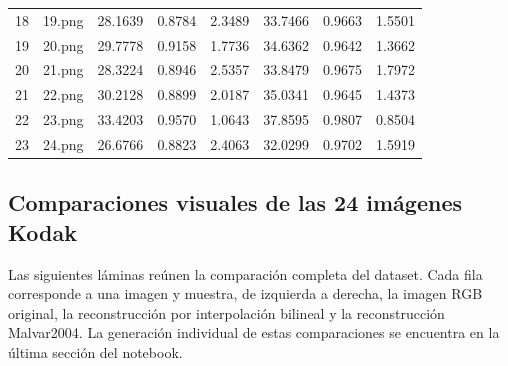 \documentclass[11pt,a4paper]{article}
\begin{document}
\begin{landscape}
{\begin{tabular}{r l r r r r r r}
18 & 19.png & 28.1639 & 0.8784 & 2.3489 & 33.7466 & 0.9663 & 1.5501 \\
19 & 20.png & 29.7778 & 0.9158 & 1.7736 & 34.6362 & 0.9642 & 1.3662 \\
20 & 21.png & 28.3224 & 0.8946 & 2.5357 & 33.8479 & 0.9675 & 1.7972 \\
21 & 22.png & 30.2128 & 0.8899 & 2.0187 & 35.0341 & 0.9645 & 1.4373 \\
22 & 23.png & 33.4203 & 0.9570 & 1.0643 & 37.8595 & 0.9807 & 0.8504 \\
23 & 24.png & 26.6766 & 0.8823 & 2.4063 & 32.0299 & 0.9702 & 1.5919 \\
\bottomrule
\end{tabular}%
}
\end{landscape}

\subsection{Comparaciones visuales de las 24 imágenes Kodak}

Las siguientes láminas reúnen la comparación completa del dataset. Cada fila
corresponde a una imagen y muestra, de izquierda a derecha, la imagen RGB
original, la reconstrucción por interpolación bilineal y la reconstrucción
Malvar2004. La generación individual de estas comparaciones se encuentra en la
última sección del notebook.
\end{document}
